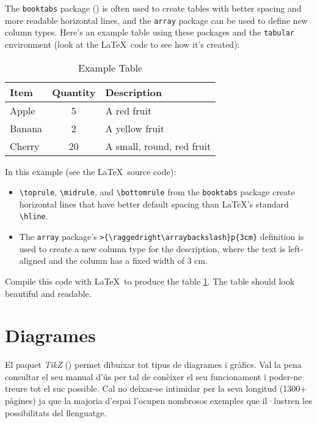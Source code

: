   The \texttt{booktabs} package (\cite{booktabs}) is often used to create tables with better spacing and more readable horizontal lines, and the \texttt{array} package can be used to define new column types. Here's an example table using these packages and the \texttt{tabular} environment (look at the \LaTeX\ code to see how it's created):
  
  \begin{table}[h]
    \centering
    \caption{Example Table}\label{tbl:table1}
    \begin{tabular}{@{} l c >{\raggedright\arraybackslash}p{5cm} @{}}
      \toprule
      Item & Quantity & Description \\
      \midrule
      Apple & 5 & A red fruit \\
      Banana & 2 & A yellow fruit \\
      Cherry & 20 & A small, round, red fruit \\
      \bottomrule
    \end{tabular}
  \end{table}
  
  In this example (see the \LaTeX\ source code):
  
  \begin{itemize}
    \item \verb|\toprule|, \verb|\midrule|, and \verb|\bottomrule| from the \texttt{booktabs} package create horizontal lines that have better default spacing than LaTeX's standard \verb|\hline|.

    \item The \texttt{array} package's \verb|>{\raggedright\arraybackslash}p{3cm}| definition is used to create a new column type for the description, where the text is left-aligned and the column has a fixed width of 3 cm.
  \end{itemize}
  
  Compile this code with \LaTeX\ to produce the table \ref{tbl:table1}. The table should look beautiful and readable.
\fi

\ifcase\doclanguage\or
  \section{Diagrames}
    El paquet \textit{TikZ} (\cite{tikz}) permet dibuixar tot tipus de diagrames i gràfics. Val la pena consultar el seu manual d'ús per tal de conèixer el seu funcionament i poder-ne treure tot el suc possible. Cal no deixar-se intimidar per la seva longitud (1300+ pàgines) ja que la majoria d'espai l'ocupen nombrosos exemples que il·lustren les possibilitats del llenguatge.
    
